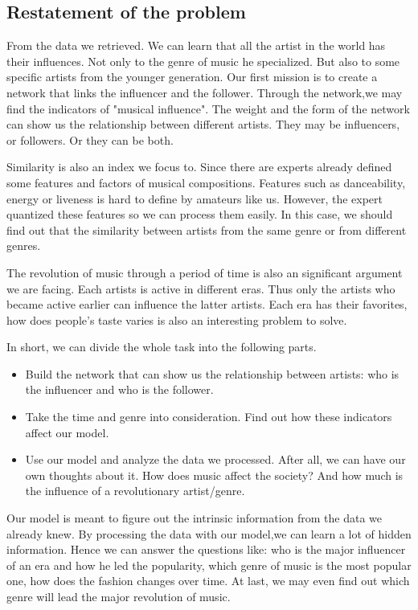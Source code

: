 \documentclass[12pt]{article}
\begin{document}
\subsection{Restatement of the problem}\quad \quad
From the data we retrieved.\cite{1} We can learn that all the artist in the world has their influences. Not only to the genre of music he specialized. But also to some specific artists from the younger generation. Our first mission is to create a network that links the influencer and the follower. Through the network,we may find the indicators of "musical influence". The weight and the form of the network can show us the relationship between different artists. They may be influencers, or followers. Or they can be both.\par
Similarity is also an index we focus to. Since there are experts already defined some features and factors of musical compositions. Features such as danceability, energy or liveness is hard to define by amateurs like us. However, the expert quantized these features so we can process them easily. In this case, we should find out that the similarity between artists from the same genre or from different genres.\par
The revolution of music through a period of time is also an significant argument we are facing. Each artists is active in different eras. Thus only the artists who became active earlier can influence the latter artists. Each era has their favorites, how does people's taste varies is also an interesting problem to solve.\par
In short, we can divide the whole task into the following parts.
\begin{itemize}
\item Build the network that can show us the relationship between artists: who is the influencer and who is the follower.
\item Take the time and genre into consideration. Find out how these indicators affect our model.
\item Use our model and analyze the data we processed. After all, we can have our own thoughts about it. How does music affect the society? And how much is the influence of a revolutionary artist/genre.
\end{itemize}
Our model is meant to figure out the intrinsic information from the data we already knew. By processing the data with our model,we can learn a lot of hidden information. Hence we can answer the questions like: who is the major influencer of an era and how he led the popularity, which genre of music is the most popular one, how does the fashion changes over time. At last, we may even find out which genre will lead the major revolution of music.
\end{document}
